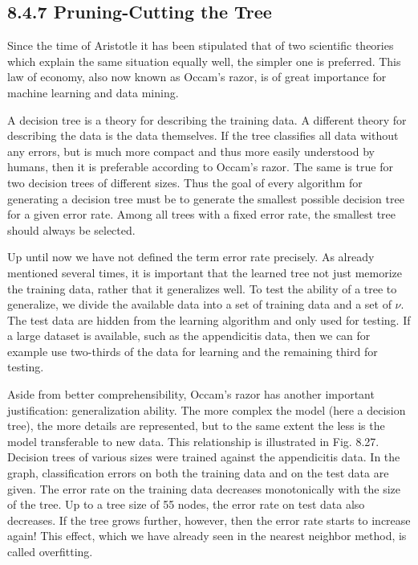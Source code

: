 \documentclass[10pt]{book}
\begin{document}
\begin{center}
\begin{enumerate}
\begin{center}
\begin{center}
\subsection*{8.4.7 Pruning-Cutting the Tree}
Since the time of Aristotle it has been stipulated that of two scientific theories which explain the same situation equally well, the simpler one is preferred. This law of economy, also now known as Occam's razor, is of great importance for machine learning and data mining.


A decision tree is a theory for describing the training data. A different theory for describing the data is the data themselves. If the tree classifies all data without any errors, but is much more compact and thus more easily understood by humans, then it is preferable according to Occam's razor. The same is true for two decision trees of different sizes. Thus the goal of every algorithm for generating a decision tree must be to generate the smallest possible decision tree for a given error rate. Among all trees with a fixed error rate, the smallest tree should always be selected.

Up until now we have not defined the term error rate precisely. As already mentioned several times, it is important that the learned tree not just memorize the training data, rather that it generalizes well. To test the ability of a tree to generalize, we divide the available data into a set of training data and a set of $\nu$. The test data are hidden from the learning algorithm and only used for testing. If a large dataset is available, such as the appendicitis data, then we can for example use two-thirds of the data for learning and the remaining third for testing.

Aside from better comprehensibility, Occam's razor has another important justification: generalization ability. The more complex the model (here a decision tree), the more details are represented, but to the same extent the less is the model transferable to new data. This relationship is illustrated in Fig. 8.27. Decision trees of various sizes were trained against the appendicitis data. In the graph, classification errors on both the training data and on the test data are given. The error rate on the training data decreases monotonically with the size of the tree. Up to a tree size of 55 nodes, the error rate on test data also decreases. If the tree grows further, however, then the error rate starts to increase again! This effect, which we have already seen in the nearest neighbor method, is called overfitting.


\end{center}
\end{center}
\end{enumerate}
\end{center}
\end{document}
